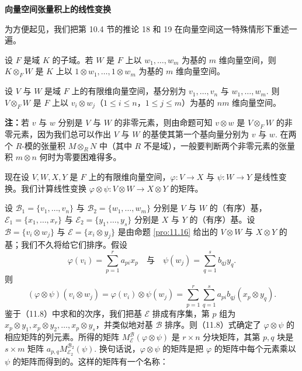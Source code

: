 \noindent\textbf{向量空间张量积上的线性变换}

为方便起见，我们把第 10.4 节的推论 18 和 19 在向量空间这一特殊情形下重述一遍。

\begin{proposition}\label{pro:11.15}
设 \(F\) 是域 \(K\) 的子域。若 \(W\) 是 \(F\) 上以 \(w_1, \ldots, w_m\) 为基的 \(m\) 维向量空间，则 \(K \otimes_F W\) 是 \(K\) 上以 \(1 \otimes w_1, \ldots, 1 \otimes w_m\) 为基的 \(m\) 维向量空间。
\end{proposition}

\begin{proposition}\label{pro:11.16}
设 \(V\) 与 \(W\) 是域 \(F\) 上的有限维向量空间，基分别为 \(v_1, \ldots, v_n\) 与 \(w_1, \ldots, w_m\). 则 \(V \otimes_F W\) 是 \(F\) 上以 \(v_i \otimes w_j\)（\(1 \leq i \leq n\)，\(1 \leq j \leq m\)）为基的 \(nm\) 维向量空间。
\end{proposition}

\noindent\textbf{注：}若 \(v\) 与 \(w\) 分别是 \(V\) 与 \(W\) 的非零元素，则由命题可知 \(v \otimes w\) 是 \(V \otimes_F W\) 的非零元素，因为我们总可以作出 \(V\) 与 \(W\) 的基使其第一个基向量分别为 \(v\) 与 \(w\). 在两个 \(R\)-模的张量积 \(M \otimes_R N\) 中（其中 \(R\) 不是域），一般要判断两个非零元素的张量积 \(m \otimes n\) 何时为零要困难得多。

现在设 \(V, W, X, Y\) 是 \(F\) 上的有限维向量空间，\(\varphi : V \to X\) 与 \(\psi : W \to Y\) 是线性变换。我们计算线性变换 \(\varphi \otimes \psi : V \otimes W \to X \otimes Y\) 的矩阵。

设 \(\mathcal{B}_1 = \{v_1, \ldots, v_n\}\) 与 \(\mathcal{B}_2 = \{w_1, \ldots, w_m\}\) 分别是 \(V\) 与 \(W\) 的（有序）基，\(\mathcal{E}_1 = \{x_1, \ldots, x_r\}\) 与 \(\mathcal{E}_2 = \{y_1, \ldots, y_s\}\) 分别是 \(X\) 与 \(Y\) 的（有序）基。设 \(\mathcal{B} = \{v_i \otimes w_j\}\) 与 \(\mathcal{E} = \{x_i \otimes y_j\}\) 是由命题 \ref{pro:11.16} 给出的 \(V \otimes W\) 与 \(X \otimes Y\) 的基；我们不久将给它们排序。假设
\[
\varphi(v_i) = \sum_{p=1}^r a_{pi}x_p \quad \text{与} \quad \psi(w_j) = \sum_{q=1}^s b_{qj}y_q.
\]
则
\begin{equation}
(\varphi \otimes \psi)(v_i \otimes w_j) = \varphi(v_i) \otimes \psi(w_j) = \sum_{p=1}^r\sum_{q=1}^s a_{pi}b_{qj}(x_p \otimes y_q). \tag{11.8}
\end{equation}
鉴于（11.8）中求和的次序，我们把基 \(\mathcal{E}\) 排成有序集，第 \(p\) 组为 \(x_p \otimes y_1, x_p \otimes y_2, \ldots, x_p \otimes y_s\)，并类似地对基 \(\mathcal{B}\) 排序。则（11.8）式确定了 \(\varphi \otimes \psi\) 的相应矩阵的列元素。所得的矩阵 \(M_{\mathcal{E}}^{\mathcal{B}}(\varphi \otimes \psi)\) 是 \(r \times n\) 分块矩阵，其第 \(p, q\) 块是 \(s \times m\) 矩阵 \(a_{p,q}M_{\mathcal{E}_2}^{\mathcal{B}_2}(\psi)\). 换句话说，\(\varphi \otimes \psi\) 的矩阵是把 \(\varphi\) 的矩阵中每个元素乘以 \(\psi\) 的矩阵而得到的。这样的矩阵有一个名称：

